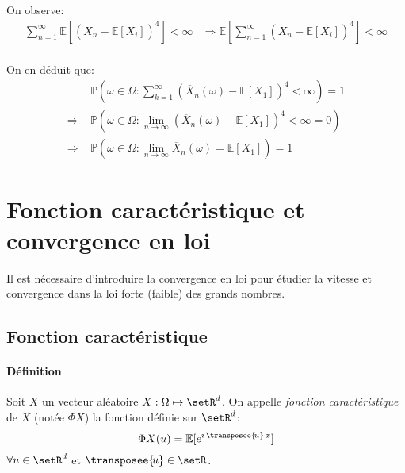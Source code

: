\documentclass[a4paper,10pt,french,openany]{memoir}
\newcommand{\Proba}{\mathbb{P}}
\newcommand{\Esper}{\mathbb{E}}
\newcommand{\implique}{\Rightarrow}
\begin{document}
On observe:
\begin{align*}
 \sum_{n=1}^\infty \Esper\left[(\overline X_n - \Esper[X_i])^4\right] < \infty &\implique \Esper\left[\sum_{n=1}^\infty (\overline X_n - \Esper[X_i])^4\right] < \infty \\
\end{align*}

On en déduit que:
\begin{align*}
 &\Proba(\omega \in \Omega: \sum_{k=1}^\infty (\overline X_n(\omega) - \Esper[X_1])^4 < \infty) = 1 \\
 \implique\;& \Proba(\omega \in \Omega: \lim_{n\to\infty} (\overline X_n(\omega) - \Esper[X_1])^4 < \infty = 0)\\
 \implique\;& \Proba(\omega \in \Omega: \lim_{n\to\infty} \overline X_n(\omega) = \Esper[X_1]) = 1
\end{align*}

\section{Fonction caractéristique et convergence en loi}

Il est nécessaire d'introduire la convergence en loi pour étudier la vitesse et convergence dans la loi forte (faible) des grands nombres.

\subsection{Fonction caractéristique}

\paragraph{Définition}
Soit $X$ un vecteur aléatoire $X:\Omega\mapsto\setR^d$. On appelle \emph{fonction caractéristique} de $X$ (notée $\Phi X$) la fonction définie sur $\setR^d$:
\[ \Phi X (u) = \Esper[e^{i\, \transposee{\!u}\, x}] \]
$\forall u \in \setR^d$ et $\transposee{\!u}\in\setR$.
\end{document}
